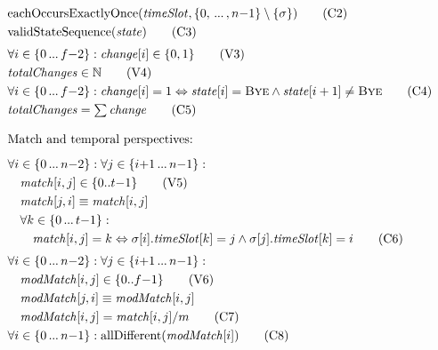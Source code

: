 \documentclass{llncs}
\newcommand{\match}{\mathit{match}}
\newcommand{\timeSlot}{\mathit{timeSlot}}
\newcommand{\state}{\mathit{state}}
\newcommand{\change}{\mathit{change}}
\newcommand{\totalChanges}{\mathit{totalChanges}}
\newcommand{\modMatch}{\mathit{modMatch}}
\newcommand{\BYE}{\textnormal{\textsc{Bye}}}
\newcommand{\eachOccursExactlyOnce}{\mathrm{eachOccursExactlyOnce}}
\newcommand{\allDifferent}{\mathrm{allDifferent}}
\newcommand{\validStateSequence}{\mathrm{validStateSequence}}
\newcommand\nldots{\,\hbox to 0.8em{.\hss.\hss.}\,}
\begin{document}
\begin{figure}[p]
\begin{framed}
\begin{align}
\begin{alignedat}{3}
    \end{alignedat} \nonumber \\
    &\eachOccursExactlyOnce(\timeSlot, \{0, \nldots, n{-}1\} \setminus \{\sigma\}) \label{C2} \tag{C2} \\
    &\validStateSequence(\state) \label{C3} \tag{C3} \\[0.1cm]
    & \forall i \in \{0 \nldots f{-}2\}: \change[{i}] \in \{0,1\} \label{V3} \tag{V3} \\
    & \totalChanges \in \mathbb{N} \label{V4} \tag{V4} \\
    & \forall i \in \{0 \nldots f{-}2\}: \change[{i}] = 1 \Leftrightarrow \state[{i}] = \BYE \wedge \state[{i + 1}] \neq \BYE \label {C4} \tag{C4} \\
    & \totalChanges = \textstyle\sum \change \label{C5} \tag{C5}
\end{align}
\end{framed}\begin{framed}
\begin{align}
    \intertext{Match and temporal perspectives:\smallskip}
    & \forall i \in \{0 \nldots n{-}2\} : \forall j \in \{ i{+}1 \nldots n{-}1 \} : \nonumber \\
    & \hspace*{1em} \match[{i,j}] \in \{0..t{-}1\} \tag{V5} \label{V5} \\
    & \hspace*{1em} \match[{j,i}] \equiv \match[{i,j}] \nonumber \\
    & \hspace*{1em} \forall k \in \{0 \nldots t{-}1 \} : \nonumber \\
    & \hspace*{2em} \match[{i,j}] = k \Leftrightarrow \sigma[{i}].\timeSlot[{k}] = j \wedge \sigma[{j}].\timeSlot[{k}] = i \tag{C6} \label{C6} \\[0.1cm]
    & \forall i \in \{0 \nldots n{-}2\} : \forall j \in \{ i{+}1 \nldots n{-}1 \} \nonumber : \\
    & \hspace*{1em} \modMatch[{i,j}] \in \{0..f{-}1\} \label{V6} \tag{V6} \\
    & \hspace*{1em} \modMatch[{j,i}] \equiv \modMatch[{i,j}] \nonumber  \\
    & \hspace*{1em} \modMatch[{i,j}] = \match[{i,j}] / m \tag{C7} \label{C7} \\
    & \forall i \in \{0 \nldots n{-}1 \} : \allDifferent(\modMatch[{i}]) \tag{C8} \label{C8} \\[0.1cm]

\end{align}
\end{framed}
\end{figure}
\end{document}
